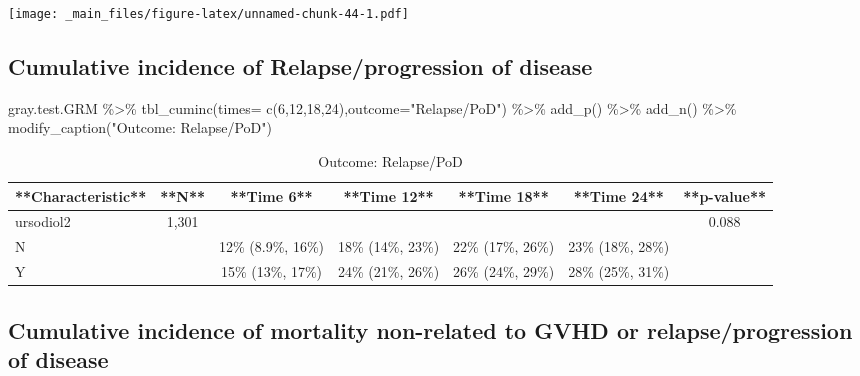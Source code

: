 \documentclass[
]{book}
\newenvironment{Shaded}{\begin{snugshade}}{\end{snugshade}}
\newcommand{\AttributeTok}[1]{\textcolor[rgb]{0.77,0.63,0.00}{#1}}
\newcommand{\DecValTok}[1]{\textcolor[rgb]{0.00,0.00,0.81}{#1}}
\newcommand{\FunctionTok}[1]{\textcolor[rgb]{0.00,0.00,0.00}{#1}}
\newcommand{\NormalTok}[1]{#1}
\newcommand{\SpecialCharTok}[1]{\textcolor[rgb]{0.00,0.00,0.00}{#1}}
\newcommand{\StringTok}[1]{\textcolor[rgb]{0.31,0.60,0.02}{#1}}
\begin{document}
\texttt{[image: \_main\_files/figure-latex/unnamed-chunk-44-1.pdf]}

\hypertarget{cumulative-incidence-of-relapseprogression-of-disease}{%
\subsection{Cumulative incidence of Relapse/progression of disease}\label{cumulative-incidence-of-relapseprogression-of-disease}}

\begin{Shaded}
\begin{Highlighting}[]
\NormalTok{gray.test.GRM }\SpecialCharTok{\%\textgreater{}\%} \FunctionTok{tbl\_cuminc}\NormalTok{(}\AttributeTok{times=} \FunctionTok{c}\NormalTok{(}\DecValTok{6}\NormalTok{,}\DecValTok{12}\NormalTok{,}\DecValTok{18}\NormalTok{,}\DecValTok{24}\NormalTok{),}\AttributeTok{outcome=}\StringTok{"Relapse/PoD"}\NormalTok{) }\SpecialCharTok{\%\textgreater{}\%} 
  \FunctionTok{add\_p}\NormalTok{() }\SpecialCharTok{\%\textgreater{}\%} 
  \FunctionTok{add\_n}\NormalTok{() }\SpecialCharTok{\%\textgreater{}\%} 
  \FunctionTok{modify\_caption}\NormalTok{(}\StringTok{"Outcome: Relapse/PoD"}\NormalTok{)}
\end{Highlighting}
\end{Shaded}

\begin{table}

\caption{\label{tab:unnamed-chunk-45}Outcome: Relapse/PoD}
\centering
\begin{tabular}[t]{l|c|c|c|c|c|c}
\hline
**Characteristic** & **N** & **Time 6** & **Time 12** & **Time 18** & **Time 24** & **p-value**\\
\hline
ursodiol2 & 1,301 &  &  &  &  & 0.088\\
\hline
N &  & 12\% (8.9\%, 16\%) & 18\% (14\%, 23\%) & 22\% (17\%, 26\%) & 23\% (18\%, 28\%) & \\
\hline
Y &  & 15\% (13\%, 17\%) & 24\% (21\%, 26\%) & 26\% (24\%, 29\%) & 28\% (25\%, 31\%) & \\
\hline
\end{tabular}
\end{table}

\hypertarget{cumulative-incidence-of-mortality-non-related-to-gvhd-or-relapseprogression-of-disease}{%
\subsection{Cumulative incidence of mortality non-related to GVHD or relapse/progression of disease}\label{cumulative-incidence-of-mortality-non-related-to-gvhd-or-relapseprogression-of-disease}}
\end{document}
